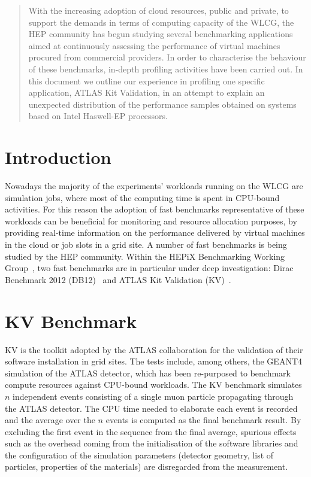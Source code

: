 \begin{abstract}
With the increasing adoption of cloud resources, public and private, to support
the demands in terms of computing capacity of the WLCG, the HEP community has begun
studying several benchmarking applications aimed at continuously assessing the
performance of virtual machines procured from commercial providers.
In order to characterise the behaviour of these benchmarks, in-depth
profiling activities have been carried out. In this document we outline
our experience in profiling one specific application, ATLAS Kit Validation,
in an attempt to explain an unexpected distribution of the performance samples
obtained on systems based on Intel Haswell-EP processors.
\end{abstract}


\section{Introduction}
Nowadays the majority of the experiments' workloads running on the WLCG are simulation 
jobs, where most of the computing time is spent in CPU-bound activities. For this 
reason the adoption of fast benchmarks representative of these workloads 
can be beneficial for monitoring and resource allocation purposes,
by providing real-time information on the performance delivered by virtual 
machines in the cloud or job slots in a grid site.
A number of fast benchmarks is being studied by the HEP community. Within the 
HEPiX Benchmarking Working Group~\cite{HEPiX:2014:HEPiX}, two fast benchmarks are 
in particular under deep investigation: Dirac Benchmark 2012 (DB12)~\cite{CERN:2016:DB12} 
and ATLAS Kit Validation (KV)~\cite{KV}.

\section{KV Benchmark}
KV is the toolkit adopted by the ATLAS collaboration for the
validation of their software installation in grid sites. The tests include, among
others, the GEANT4~\cite{GEANT4} simulation of the ATLAS detector, which
has been re-purposed to benchmark compute resources against CPU-bound 
workloads. The KV benchmark simulates $n$ independent events consisting of a single muon particle 
propagating through the ATLAS detector. The CPU time needed to elaborate each event 
is recorded and the average over the $n$ events is computed as the final benchmark result.
By excluding the first event in the sequence from the final average, spurious effects such as the 
overhead coming from the initialisation of the software libraries and the configuration 
of the simulation parameters (detector geometry, list of particles, properties of 
the materials) are disregarded from the measurement.

